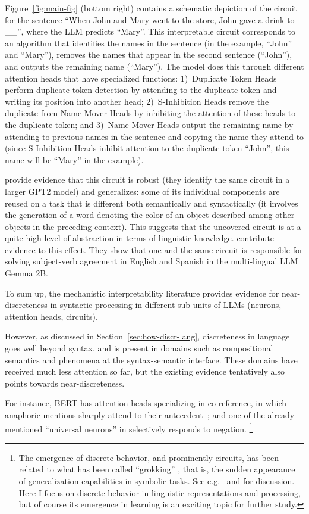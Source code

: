 Figure~\ref{fig:main-fig} (bottom right) contains a schematic depiction of the circuit for the sentence ``When John and Mary went to the store, John gave a drink to \_\_'', where the LLM predicts ``Mary''.
This interpretable circuit corresponds to an algorithm that identifies the names in the sentence (in the example, ``John'' and ``Mary''), removes the names that appear in the second sentence (``John''), and outputs the remaining name (``Mary'').
The model does this through different attention heads that have specialized functions: 1)~Duplicate Token Heads perform duplicate token detection by attending to the duplicate token and writing its position into another head; 2)~S-Inhibition Heads remove the duplicate from Name Mover Heads by inhibiting the attention of these heads to the duplicate token; and 3)~Name Mover Heads output the remaining name by attending to previous names in the sentence and copying the name they attend to (since S-Inhibition Heads inhibit attention to the duplicate token ``John'', this name will be ``Mary'' in the example).

\citet{merullo2024circuit} provide evidence that this circuit is robust (they identify the same circuit in a larger GPT2 model) and generalizes: some of its individual components are reused on a task that is different both semantically and syntactically (it involves the generation of a word denoting the color of an object described among other objects in the preceding context).
This suggests that the uncovered circuit is at a quite high level of abstraction in terms of linguistic knowledge.
\citet{ferrando-costa-jussa-2024-similarity} contribute evidence to this effect. They show that one and the same circuit is responsible for solving subject-verb agreement in English and Spanish in the multi-lingual LLM Gemma 2B.

To sum up, the mechanistic interpretability literature provides evidence for near-discreteness in syntactic processing in different sub-units of LLMs (neurons, attention heads, circuits).

However, as discussed in Section~\ref{sec:how-discr-lang}, discreteness in language goes well beyond syntax, and is present in domains such as compositional semantics and phenomena at the syntax-semantic interface.
These domains have received much less attention so far, but the existing evidence tentatively also points towards near-discreteness.

For instance, BERT has attention heads specializing in co-reference, in which anaphoric mentions sharply attend to their antecedent~\cite[][see Figure~\ref{fig:coref}]{clark-etal-2019-bert}; and one of the already mentioned ``universal neurons'' in \citet{gurnee2024universal} selectively responds to negation.
\footnote{The emergence of discrete behavior, and prominently circuits, has been related to what has been called ``grokking'' \cite{grokking}, that is, the sudden appearance of generalization capabilities in symbolic tasks. See e.g.\ \citet{nanda2023progress} and \citet{varma2023explaininggrokkingcircuitefficiency} for discussion. Here I focus on discrete behavior in linguistic representations and processing, but of course its emergence in learning is an exciting topic for further study.}

